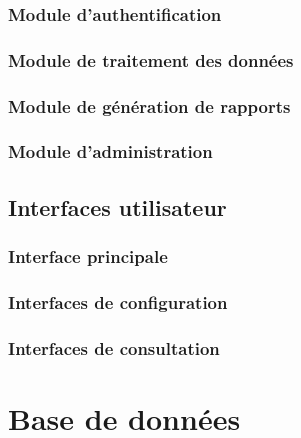 
\subsubsection{Module d'authentification}


\subsubsection{Module de traitement des données}


\subsubsection{Module de génération de rapports}


\subsubsection{Module d'administration}


\subsection{Interfaces utilisateur}


\subsubsection{Interface principale}


\subsubsection{Interfaces de configuration}


\subsubsection{Interfaces de consultation}


\section{Base de données}

